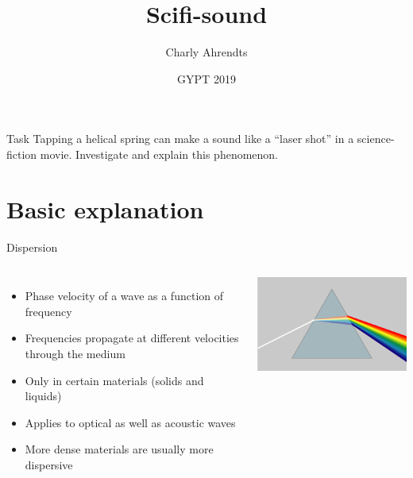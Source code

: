 \documentclass{beamer}
\title{Scifi-sound}
\author{Charly Ahrendts}
\date{GYPT 2019}
\begin{document}
\frame{\titlepage}

\begin{frame}{Task}
Tapping a helical spring can make a sound like a “laser shot” in a science-fiction movie.
Investigate and explain this phenomenon.
\end{frame}
   

\section {Basic explanation}
	\begin{frame}{Dispersion}
  \begin{columns}
			\begin{itemize}
			\item
				Phase velocity of a wave as a function of frequency
			\item
				Frequencies propagate at different velocities through the medium
			\item
				Only in certain materials (solids and liquids)
			\item
				Applies to optical as well as acoustic waves
			\item
				More dense materials are usually more dispersive 
			\end{itemize}
      
     	 \includegraphics [scale=0.4]{images/prism.png}

    \end{columns}
	
   			
	\end{frame}
\end{document}
